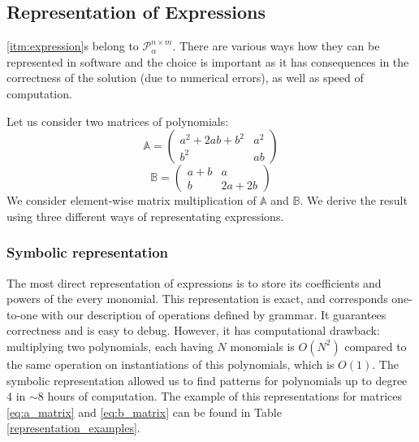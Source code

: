 \subsection{Representation of Expressions} \label{representation}
\ref{itm:expression}s belong to $\mathcal{P}^{n \times m}_\alpha$. There are various
ways how they can be represented in software and the choice is
important as it has consequences in the correctness of the solution
(due to numerical errors), as well as speed of computation.

Let us consider two matrices of polynomials:
\begin{equation}
\label{eq:a_matrix}
\mathbb{A} = \begin{pmatrix} a^2 + 2ab + b^2 & a^2\\ b^2 & ab \end{pmatrix} 
\end{equation}
\begin{equation}
\label{eq:b_matrix}
\mathbb{B} = \begin{pmatrix} a + b & a\\ b & 2a + 2b \end{pmatrix}
\end{equation}
We consider element-wise matrix multiplication of $\mathbb{A}$ and
$\mathbb{B}$. We derive the result using three different ways of
representating expressions.



\subsubsection{Symbolic representation}
The most direct representation of expressions is to store its coefficients and powers of the every monomial.
This representation is exact, and corresponds one-to-one with our description of operations
defined by grammar. It guarantees correctness and is easy to debug. 
However, it has computational drawback: multiplying two polynomials, each having $N$ monomials is $O(N^2)$ compared to the same operation on instantiations of this polynomials, which is $O(1)$.
The symbolic representation allowed us
to find patterns for polynomials up to degree $4$ in $\sim 8$ hours of computation. 
The example of this representations for matrices \ref{eq:a_matrix} and \ref{eq:b_matrix} can be found
in Table \ref{representation_examples}.

